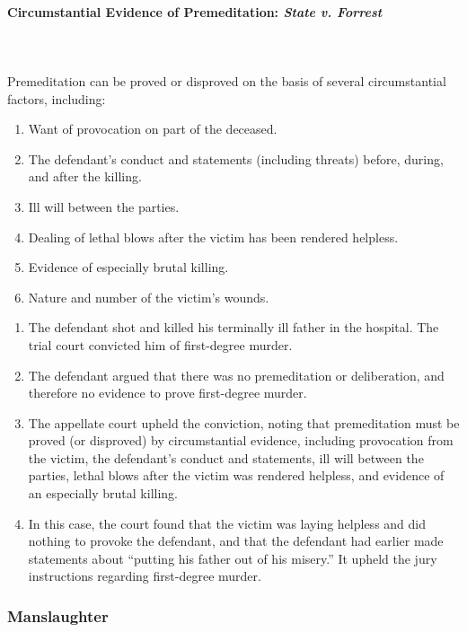 \paragraph{Circumstantial Evidence of Premeditation: \emph{State v. Forrest}}
~\\\\
Premeditation can be proved or disproved on the basis of several 
circumstantial factors, including:
\begin{enumerate}
    \item Want of provocation on part of the deceased.
    \item The defendant's conduct and statements (including threats) before, 
    during, and after the killing.
    \item Ill will between the parties.
    \item Dealing of lethal blows after the victim has been rendered helpless.
    \item Evidence of especially brutal killing.
    \item Nature and number of the victim's wounds.
\end{enumerate}

\begin{enumerate}
    \item The defendant shot and killed his terminally ill father in the 
    hospital. The trial court convicted him of first-degree murder.
    \item The defendant argued that there was no premeditation or 
    deliberation, and therefore no evidence to prove first-degree murder.
    \item The appellate court upheld the conviction, noting that premeditation 
    must be proved (or disproved) by circumstantial evidence, including 
    provocation from the victim, the defendant's conduct and statements, ill 
    will between the parties, lethal blows after the victim was rendered 
    helpless, and evidence of an especially brutal killing.
    \item In this case, the court found that the victim was laying helpless 
    and did nothing to provoke the defendant, and that the defendant had 
    earlier made statements about ``putting his father out of his misery.'' It 
    upheld the jury instructions regarding first-degree murder.
\end{enumerate}

\subsubsection{Manslaughter}

